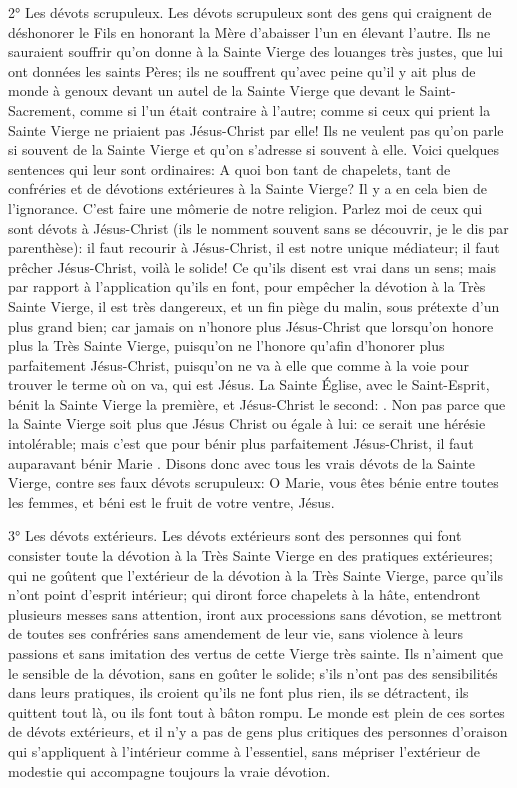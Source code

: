 2° Les dévots scrupuleux.
 Les dévots scrupuleux sont des gens qui craignent de déshonorer le Fils en honorant la Mère d'abaisser l'un
en élevant l'autre. Ils ne sauraient souffrir qu'on donne à la Sainte Vierge des louanges très justes, que lui ont
données les saints Pères; ils ne souffrent qu'avec peine qu'il y ait plus de monde à genoux devant un autel de la
Sainte Vierge que devant le Saint-Sacrement, comme si l'un était contraire à l'autre; comme si ceux qui prient la
Sainte Vierge ne priaient pas Jésus-Christ par elle! Ils ne veulent pas qu'on parle si souvent de la Sainte Vierge et
qu'on s'adresse si souvent à elle.
Voici quelques sentences qui leur sont ordinaires: A quoi bon tant de chapelets, tant de confréries et de dévotions
extérieures à la Sainte Vierge? Il y a en cela bien de l'ignorance. C'est faire une mômerie de notre religion. Parlez moi de ceux qui sont dévots à Jésus-Christ (ils le nomment souvent sans se découvrir, je le dis par parenthèse): il
faut recourir à Jésus-Christ, il est notre unique médiateur; il faut prêcher Jésus-Christ, voilà le solide!
Ce qu'ils disent est vrai dans un sens; mais par rapport à l'application qu'ils en font, pour empêcher la dévotion à la
Très Sainte Vierge, il est très dangereux, et un fin piège du malin, sous prétexte d'un plus grand bien; car jamais
on n'honore plus Jésus-Christ que lorsqu'on honore plus la Très Sainte Vierge, puisqu'on ne l'honore qu'afin
d'honorer plus parfaitement Jésus-Christ, puisqu'on ne va à elle que comme à la voie pour trouver le terme où on
va, qui est Jésus.
 La Sainte Église, avec le Saint-Esprit, bénit la Sainte Vierge la première, et Jésus-Christ le second: . Non pas parce que la Sainte Vierge soit plus que Jésus
Christ ou égale à lui: ce serait une hérésie intolérable; mais c'est que pour bénir plus parfaitement Jésus-Christ, il
faut auparavant bénir Marie . Disons donc avec tous les vrais dévots de la Sainte Vierge, contre ses faux dévots
scrupuleux: O Marie, vous êtes bénie entre toutes les femmes, et béni est le fruit de votre ventre, Jésus.

3° Les dévots extérieurs.
 Les dévots extérieurs sont des personnes qui font consister toute la dévotion à la Très Sainte Vierge en des
pratiques extérieures; qui ne goûtent que l'extérieur de la dévotion à la Très Sainte Vierge, parce qu'ils n'ont point
d'esprit intérieur; qui diront force chapelets à la hâte, entendront plusieurs messes sans attention, iront aux
processions sans dévotion, se mettront de toutes ses confréries sans amendement de leur vie, sans violence à
leurs passions et sans imitation des vertus de cette Vierge très sainte. Ils n'aiment que le sensible de la dévotion,
sans en goûter le solide; s'ils n'ont pas des sensibilités dans leurs pratiques, ils croient qu'ils ne font plus rien, ils
se détractent, ils quittent tout là, ou ils font tout à bâton rompu. Le monde est plein de ces sortes de dévots
extérieurs, et il n'y a pas de gens plus critiques des personnes d'oraison qui s'appliquent à l'intérieur comme à
l'essentiel, sans mépriser l'extérieur de modestie qui accompagne toujours la vraie dévotion.

